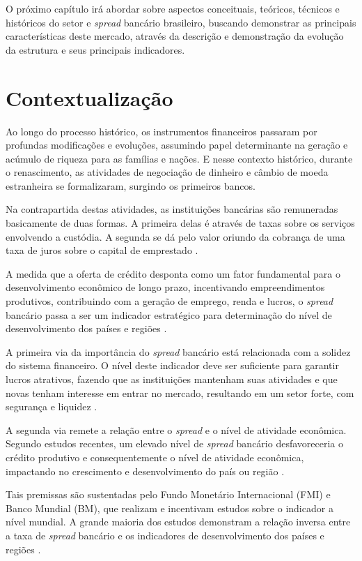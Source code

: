 \documentclass[
  12pt,
  12pt,
  openright,
  oneside,
  a4paper,
  chapter=TITLE,
  section=TITLE,
  subsection=TITLE,
  subsubsection=TITLE,
  english,
  portugues,
  sumario=tradicional]{abntex2}
\begin{document}
O próximo capítulo irá abordar sobre aspectos conceituais, teóricos, técnicos e históricos do setor e \emph{spread} bancário brasileiro, buscando demonstrar as principais características deste mercado, através da descrição e demonstração da evolução da estrutura e seus principais indicadores.

\section{Contextualização}

Ao longo do processo histórico, os instrumentos financeiros passaram por profundas modificações e evoluções, assumindo papel determinante na geração e acúmulo de riqueza para as famílias e nações. E nesse contexto histórico, durante o renascimento, as atividades de negociação de dinheiro e câmbio de moeda estranheira se formalizaram, surgindo os primeiros bancos.

Na contrapartida destas atividades, as instituições bancárias são remuneradas basicamente de duas formas. A primeira delas é através de taxas sobre os serviços envolvendo a custódia. A segunda se dá pelo valor oriundo da cobrança de uma taxa de juros sobre o capital de emprestado \cite{leite:1996, campello:2005, neves:2007}.

A medida que a oferta de crédito desponta como um fator fundamental para o desenvolvimento econômico de longo prazo, incentivando empreendimentos produtivos, contribuindo com a geração de emprego, renda e lucros, o \emph{spread} bancário passa a ser um indicador estratégico para determinação do nível de desenvolvimento dos países e regiões \cite{WB:2005, levine:1997}.

A primeira via da importância do \emph{spread} bancário está relacionada com a
solidez do sistema financeiro. O nível deste indicador deve ser suficiente para
garantir lucros atrativos, fazendo que as instituições mantenham suas
atividades e que novas tenham interesse em entrar no mercado, resultando em um
setor forte, com segurança e liquidez \cite{levine:1997, dantas:2012, leal:2006}.

A segunda via remete a relação entre o \emph{spread} e o nível de atividade
econômica. Segundo estudos recentes, um elevado nível de \emph{spread} bancário
desfavoreceria o crédito produtivo e consequentemente o nível de atividade
econômica, impactando no crescimento e desenvolvimento do país ou região \cite{WB:2005, dantas:2012, leal:2006}.

Tais premissas são sustentadas pelo Fundo Monetário Internacional (FMI) e Banco Mundial (BM), que realizam e incentivam estudos sobre o indicador a nível mundial. A grande maioria dos estudos demonstram a relação inversa entre a taxa de \emph{spread} bancário e os indicadores de desenvolvimento dos países e regiões \cite{WB:2005}.
\end{document}
